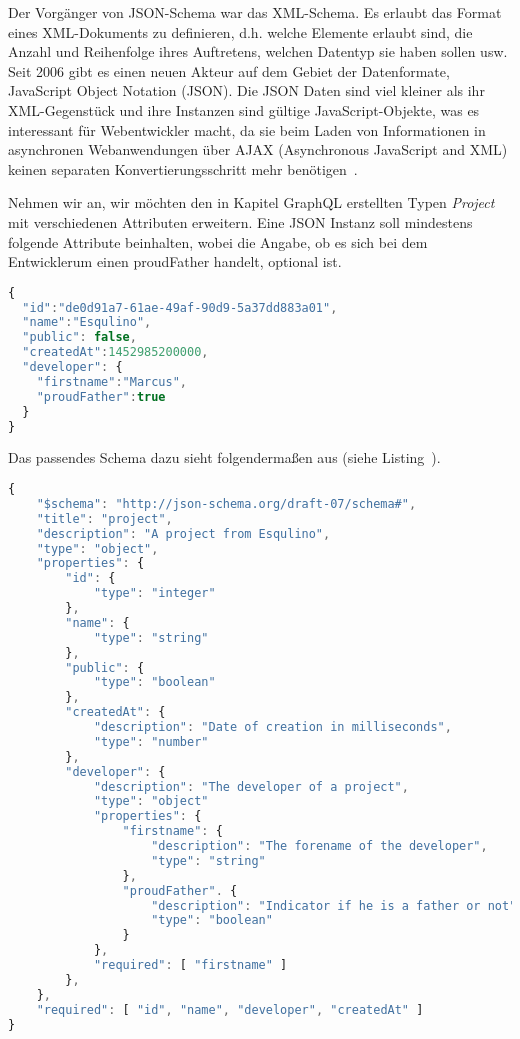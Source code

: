 Der Vorgänger von JSON-Schema war das XML-Schema.
Es erlaubt das Format eines XML-Dokuments zu definieren,
d.h. welche Elemente erlaubt sind, die Anzahl und Reihenfolge ihres Auftretens, welchen Datentyp sie haben sollen usw.
Seit 2006 gibt es einen neuen Akteur auf dem Gebiet der Datenformate, JavaScript Object Notation (JSON).
Die JSON Daten sind viel kleiner als ihr XML-Gegenstück und ihre Instanzen sind gültige JavaScript-Objekte, was es interessant für Webentwickler macht, da sie beim Laden von
Informationen in asynchronen Webanwendungen über AJAX (Asynchronous JavaScript and XML) keinen separaten Konvertierungsschritt mehr benötigen~\cite{json-schema-xml}.

Nehmen wir an, wir möchten den in Kapitel GraphQL erstellten Typen \emph{Project}~ mit verschiedenen Attributen erweitern.
Eine JSON Instanz soll mindestens folgende Attribute beinhalten, wobei die Angabe, ob es sich bei dem Entwicklerum einen proudFather handelt, optional ist.

\begin{lstlisting}[language=Javascript,float=h!,caption={Ein Projekt als JSON Objekt}, label={fig:basics:jsonschema:1}]
{
  "id":"de0d91a7-61ae-49af-90d9-5a37dd883a01",
  "name":"Esqulino",
  "public": false,
  "createdAt":1452985200000,
  "developer": {
    "firstname":"Marcus",
    "proudFather":true
  }
}
\end{lstlisting}

Das passendes Schema dazu sieht folgendermaßen aus (siehe Listing~).

\begin{lstlisting}[language=Javascript,float=h!,caption={JSON Schema zu Projekt Objekt}, label={fig:basics:jsonschema:2}]
{
    "$schema": "http://json-schema.org/draft-07/schema#",
    "title": "project",
    "description": "A project from Esqulino",
    "type": "object",
    "properties": {
        "id": {
            "type": "integer"
        },
        "name": {
            "type": "string"
        },
        "public": {
            "type": "boolean"
        },
        "createdAt": {
            "description": "Date of creation in milliseconds",
            "type": "number"
        },
        "developer": {
            "description": "The developer of a project",
            "type": "object"
            "properties": {
                "firstname": {
                    "description": "The forename of the developer",
                    "type": "string"
                },
                "proudFather". {
                    "description": "Indicator if he is a father or not",
                    "type": "boolean"
                }
            },
            "required": [ "firstname" ]
        },
    },
    "required": [ "id", "name", "developer", "createdAt" ]
}
\end{lstlisting}

